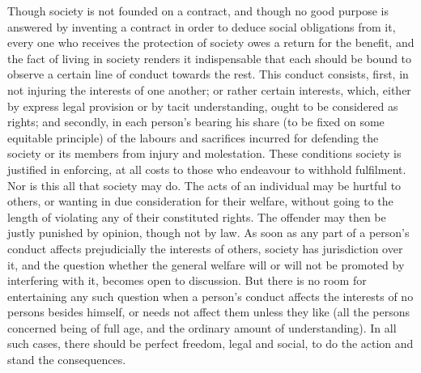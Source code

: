 \documentclass[11pt,openany]{book}
\begin{document}
Though society is not founded on a contract, and though no good purpose is answered by inventing a contract in order to deduce social obligations from it, every one who receives the protection of society owes a return for the benefit, and the fact of living in society renders it indispensable that each should be bound to observe a certain line of conduct towards the rest. This conduct consists, first, in not injuring the interests of one another; or rather certain interests, which, either by express legal provision or by tacit understanding, ought to be considered as rights; and secondly, in each person's bearing his share (to be fixed on some equitable principle) of the labours and sacrifices incurred for defending the society or its members from injury and molestation. These conditions society is justified in enforcing, at all costs to those who endeavour to withhold fulfilment. Nor is this all that society may do. The acts of an individual may be hurtful to others, or wanting in due consideration for their welfare, without going to the length of violating any of their constituted rights. The offender may then be justly punished by opinion, though not by law. As soon as any part of a person's conduct affects prejudicially the interests of others, society has jurisdiction over it, and the question whether the general welfare will or will not be promoted by interfering with it, becomes open to discussion. But there is no room for entertaining any such question when a person's conduct affects the interests of no persons besides himself, or needs not affect them unless they like (all the persons concerned being of full age, and the ordinary amount of understanding). In all such cases, there should be perfect freedom, legal and social, to do the action and stand the consequences.
\end{document}
